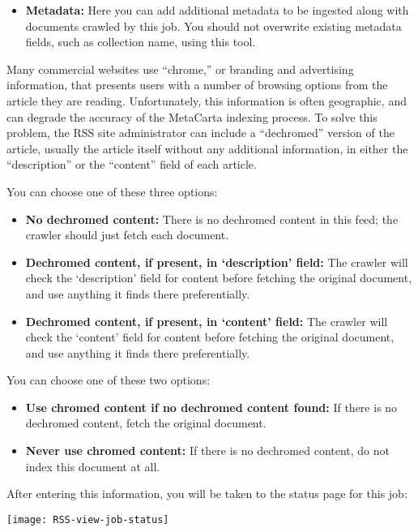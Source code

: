 
\begin{itemize}

\item \textbf{Metadata:} Here you can add additional metadata to be ingested along with documents crawled by this job. You should not overwrite existing metadata fields, such as collection name, using this tool.

\end{itemize}


Many commercial websites use ``chrome,'' or branding and advertising
information, that presents users with a number of browsing options
from the article they are reading. Unfortunately, this information
is often geographic, and can degrade the accuracy of the MetaCarta
indexing process. To solve this problem, the RSS site administrator
can include a ``dechromed'' version of the article, usually the article
itself without any additional information, in either the ``description''
or the ``content'' field of each article.

You can choose one of these three options:

\begin{itemize}

\item \textbf{No dechromed content:} There is no dechromed content in
this feed; the crawler should just fetch each document.

\item \textbf{Dechromed content, if present, in `description' field:}
The crawler will check the `description' field for content before fetching
the original document, and use anything it finds there preferentially.

\item \textbf{Dechromed content, if present, in `content' field:}
The crawler will check the `content' field for content before fetching
the original document, and use anything it finds there preferentially.

\end{itemize}

You can choose one of these two options:

\begin{itemize}

\item \textbf{Use chromed content if no dechromed content found:} If
there is no dechromed content, fetch the original document.

\item \textbf{Never use chromed content:} If there is no dechromed content,
do not index this document at all.

\end{itemize}

After entering this information, you will be taken to the status page
for this job:

\texttt{[image: RSS-view-job-status]}
